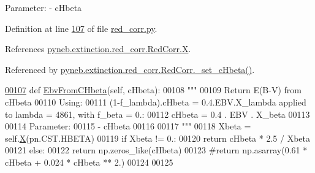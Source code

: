\begin{DoxyVerb}
\begin{DoxyVerb}
Parameter:
    - cHbeta\end{DoxyVerb}
 

Definition at line \hyperlink{red__corr_8py_source_l00107}{107} of file \hyperlink{red__corr_8py_source}{red\+\_\+corr.\+py}.



References \hyperlink{red__corr_8py_source_l00180}{pyneb.\+extinction.\+red\+\_\+corr.\+Red\+Corr.\+X}.



Referenced by \hyperlink{red__corr_8py_source_l00164}{pyneb.\+extinction.\+red\+\_\+corr.\+Red\+Corr.\+\_\+set\+\_\+c\+Hbeta()}.


\begin{DoxyCode}
\hypertarget{classpyneb_1_1extinction_1_1red__corr_1_1_red_corr_l00107}{}\hyperlink{classpyneb_1_1extinction_1_1red__corr_1_1_red_corr_a0230c671df9a21eeb7d15008946780d0}{00107}     \textcolor{keyword}{def }\hyperlink{classpyneb_1_1extinction_1_1red__corr_1_1_red_corr_a0230c671df9a21eeb7d15008946780d0}{EbvFromCHbeta}(self, cHbeta):
00108         \textcolor{stringliteral}{"""}
00109 \textcolor{stringliteral}{        Return E(B-V) from cHbeta}
00110 \textcolor{stringliteral}{        Using: }
00111 \textcolor{stringliteral}{            (1-f\_lambda).cHbeta = 0.4.EBV.X\_lambda applied to lambda = 4861, with f\_beta = 0.:}
00112 \textcolor{stringliteral}{            cHbeta = 0.4 . EBV . X\_beta}
00113 \textcolor{stringliteral}{        }
00114 \textcolor{stringliteral}{        Parameter:}
00115 \textcolor{stringliteral}{            - cHbeta}
00116 \textcolor{stringliteral}{            }
00117 \textcolor{stringliteral}{        """}
00118         Xbeta = self.\hyperlink{classpyneb_1_1extinction_1_1red__corr_1_1_red_corr_aac92bb80311cda78c01e61aa44655251}{X}(pn.CST.HBETA)
00119         \textcolor{keywordflow}{if} Xbeta != 0.:
00120             \textcolor{keywordflow}{return} cHbeta * 2.5 / Xbeta
00121         \textcolor{keywordflow}{else}:
00122             \textcolor{keywordflow}{return} np.zeros\_like(cHbeta)
00123         \textcolor{comment}{#return np.asarray(0.61 * cHbeta + 0.024 * cHbeta ** 2.)}
00124     
00125     
\end{DoxyCode}
\hypertarget{classpyneb_1_1extinction_1_1red__corr_1_1_red_corr_a4fd27cfde692dbe6f3ff3d039bde2929}{}

\end{DoxyVerb}
